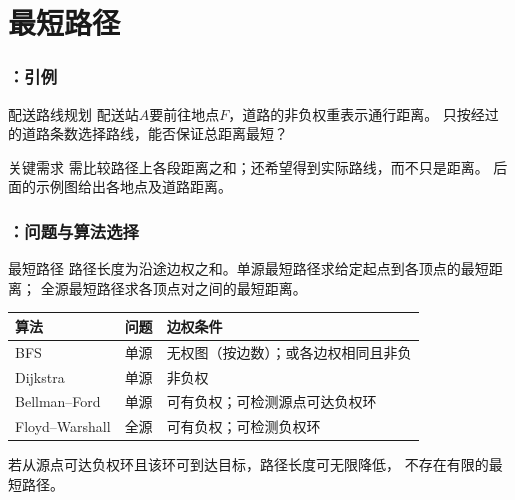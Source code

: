 \section{最短路径}

\begin{frame}
    \frametitle{\insertsectionhead：引例}
    \begin{exampleblock}{配送路线规划}
        配送站$A$要前往地点$F$，道路的非负权重表示通行距离。
        只按经过的道路条数选择路线，能否保证总距离最短？
    \end{exampleblock}
    \begin{block}{关键需求}
        需比较路径上各段距离之和；还希望得到实际路线，而不只是距离。
        后面的示例图给出各地点及道路距离。
    \end{block}
\end{frame}

\begin{frame}
    \frametitle{\insertsectionhead：问题与算法选择}
    \begin{block}{最短路径}
        路径长度为沿途边权之和。单源最短路径求给定起点到各顶点的最短距离；
        全源最短路径求各顶点对之间的最短距离。
    \end{block}
    \begin{table}
        \centering
        \small
        \begin{tabular}{lll}
            \toprule
            算法 & 问题 & 边权条件 \\
            \midrule
            BFS & 单源 & 无权图（按边数）；或各边权相同且非负 \\
            Dijkstra & 单源 & 非负权 \\
            Bellman--Ford & 单源 & 可有负权；可检测源点可达负权环 \\
            Floyd--Warshall & 全源 & 可有负权；可检测负权环 \\
            \bottomrule
        \end{tabular}
    \end{table}
    \small 若从源点可达负权环且该环可到达目标，路径长度可无限降低，
    不存在有限的最短路径。
\end{frame}

